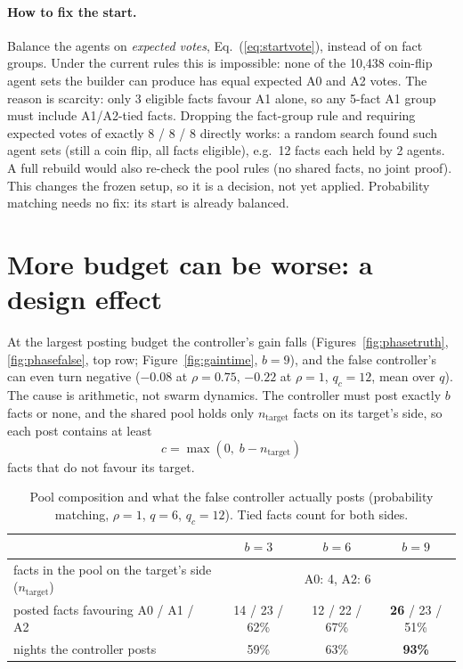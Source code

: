 \documentclass[10pt,a4paper]{article}
\begin{document}
\paragraph{How to fix the start.} Balance the agents on \emph{expected votes},
Eq.~(\ref{eq:startvote}), instead of on fact groups. Under the current rules this is
impossible: none of the 10,438 coin-flip agent sets the builder can produce has equal
expected A0 and A2 votes. The reason is scarcity: only 3 eligible facts favour A1
alone, so any 5-fact A1 group must include A1/A2-tied facts. Dropping the
fact-group rule and requiring expected votes of exactly 8 / 8 / 8 directly works: a
random search found such agent sets (still a coin flip, all facts eligible), e.g.\ 12
facts each held by 2 agents. A full rebuild would also re-check the pool rules (no
shared facts, no joint proof). This changes the frozen setup, so it is a decision, not
yet applied. Probability matching needs no fix: its start is already balanced.

\section{More budget can be worse: a design effect}\label{sec:budget}

At the largest posting budget the controller's gain falls (Figures~\ref{fig:phasetruth},
\ref{fig:phasefalse}, top row; Figure~\ref{fig:gaintime}, $b = 9$), and the false
controller's can even turn negative ($-0.08$ at $\rho = 0.75$, $-0.22$ at $\rho = 1$,
$q_c = 12$, mean over $q$). The cause is arithmetic, not swarm dynamics. The controller
must post exactly $b$ facts or none, and the shared pool holds only $n_{\text{target}}$
facts on its target's side, so each post contains at least
\begin{equation}\label{eq:counter}
c = \max(0,\; b - n_{\text{target}})
\end{equation}
facts that do not favour its target.

\begin{table}[H]
\centering\small
\caption{Pool composition and what the false controller actually posts (probability
matching, $\rho = 1$, $q = 6$, $q_c = 12$). Tied facts count for both sides.}
\label{tab:budget}
\begin{tabular}{lccc}
\toprule
 & $b = 3$ & $b = 6$ & $b = 9$ \\
\midrule
facts in the pool on the target's side ($n_{\text{target}}$) & \multicolumn{3}{c}{A0: 4, \; A2: 6} \\
posted facts favouring A0 / A1 / A2 & 14 / 23 / 62\% & 12 / 22 / 67\% & \textbf{26} / 23 / 51\% \\
nights the controller posts & 59\% & 63\% & \textbf{93\%} \\
\bottomrule
\end{tabular}
\end{table}
\end{document}
